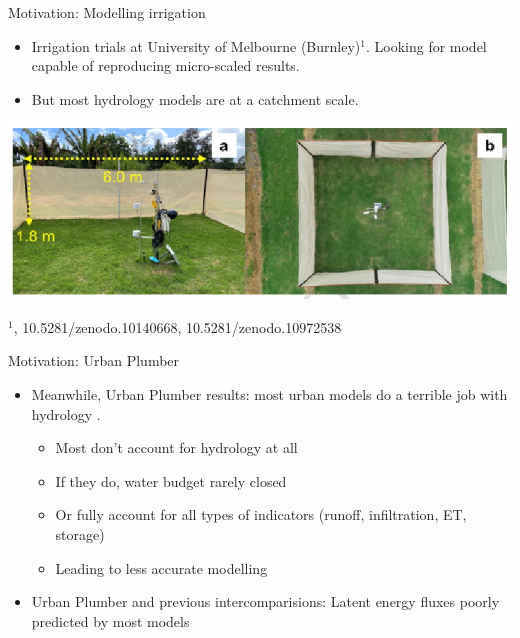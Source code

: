 \documentclass{beamer}
\begin{document}
\begin{frame}{Motivation: Modelling irrigation} 

\begin{itemize}
\item Irrigation trials at University of Melbourne (Burnley)$^{1}$. Looking for model capable of reproducing micro-scaled results.\\ 
\item But most hydrology models are at a catchment scale.
\end{itemize}
\begin{center}
\includegraphics[scale=0.60]{Screenshot_20250703_100546.png}
\end{center}
$^{1}${\footnotesize \cite{Cheung2024}, 10.5281/zenodo.10140668, 10.5281/zenodo.10972538}
\end{frame}






\begin{frame}{Motivation: Urban Plumber} 
\begin{itemize}

\item Meanwhile, Urban Plumber results: most urban models do a terrible job with hydrology {\footnotesize \citep{jongen_water_2024}}.
\begin{itemize}
\item Most don't account for hydrology at all
\item If they do, water budget rarely closed
\item Or fully account for all types of indicators (runoff, infiltration, ET, storage)
\item Leading to less accurate modelling
\end{itemize}
\item Urban Plumber and previous intercomparisions: Latent energy fluxes poorly predicted by most models {\footnotesize \citep{lipson_evaluation_2024,grimmond_initial_2011}}
\end{itemize}
\end{frame}
\end{document}
